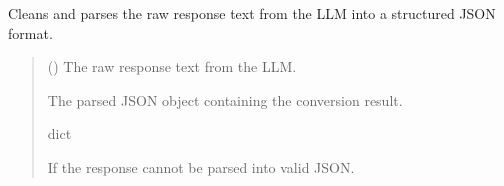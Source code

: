 \documentclass[letterpaper,10pt,english]{sphinxmanual}
\begin{document}

\begin{fulllineitems}
\label{\detokenize{modules.data_storage:modules.data_storage.llm_standardize.safe_json_parse}}
\pysigstartsignatures
\pysiglinewithargsret
{}
{}
{}
\pysigstopsignatures
\sphinxAtStartPar
Cleans and parses the raw response text from the LLM into a structured JSON format.
\begin{quote}\begin{description}
\sphinxAtStartPar
{} () \textendash{} The raw response text from the LLM.

\sphinxAtStartPar
The parsed JSON object containing the conversion result.

\sphinxAtStartPar
dict

\sphinxAtStartPar
{} \textendash{} If the response cannot be parsed into valid JSON.

\end{description}\end{quote}

\end{fulllineitems}

\end{document}
